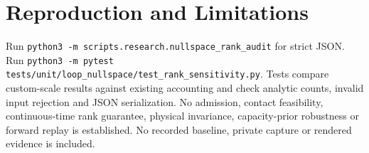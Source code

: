 \documentclass{article}
\begin{document}
\section{Reproduction and Limitations}
Run \texttt{python3 -m scripts.research.nullspace\_rank\_audit} for strict JSON.
Run \texttt{python3 -m pytest tests/unit/loop\_nullspace/test\_rank\_sensitivity.py}.
Tests compare custom-scale results against existing accounting and check
analytic counts, invalid input rejection and JSON serialization.
No admission, contact feasibility, continuous-time rank guarantee, physical
invariance, capacity-prior robustness or forward replay is established.
No recorded baseline, private capture or rendered evidence is included.
\end{document}
